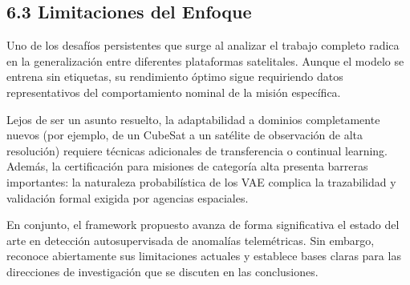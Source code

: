 \subsection{6.3 Limitaciones del Enfoque}

Uno de los desafíos persistentes que surge al analizar el trabajo completo radica en la generalización entre diferentes plataformas satelitales. Aunque el modelo se entrena sin etiquetas, su rendimiento óptimo sigue requiriendo datos representativos del comportamiento nominal de la misión específica. 

Lejos de ser un asunto resuelto, la adaptabilidad a dominios completamente nuevos (por ejemplo, de un CubeSat a un satélite de observación de alta resolución) requiere técnicas adicionales de transferencia o continual learning. Además, la certificación para misiones de categoría alta presenta barreras importantes: la naturaleza probabilística de los VAE complica la trazabilidad y validación formal exigida por agencias espaciales.

En conjunto, el framework propuesto avanza de forma significativa el estado del arte en detección autosupervisada de anomalías telemétricas. Sin embargo, reconoce abiertamente sus limitaciones actuales y establece bases claras para las direcciones de investigación que se discuten en las conclusiones.